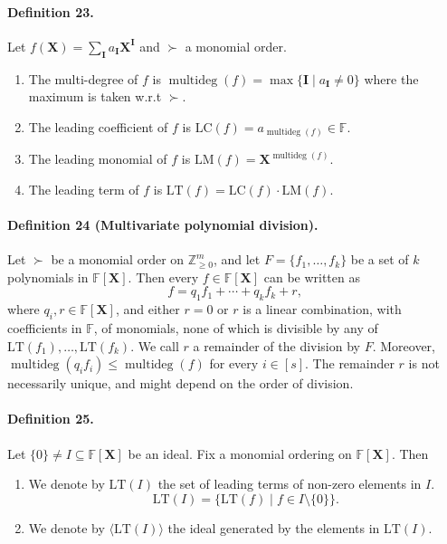 \documentclass[10pt,a4paper]{article}
\begin{document}
\paragraph{Definition 23.} Let $f(\boldsymbol X)=\sum_{\boldsymbol I}a_{\boldsymbol I}\boldsymbol X^{\boldsymbol I}$ and $\succ$ a monomial order.
\begin{enumerate}
\item The multi-degree of $f$ is $\operatorname{multideg}(f)=\max\{\boldsymbol I\mid a_{\boldsymbol I}\neq0\}$ where the maximum is taken w.r.t $\succ$.
\item The leading coefficient of $f$ is $\mathrm{LC}(f)=a_{\operatorname{multideg}(f)}\in\mathbb F$.
\item The leading monomial of $f$ is $\mathrm{LM}(f)=\boldsymbol X^{\operatorname{multideg}(f)}$.
\item The leading term of $f$ is $\mathrm{LT}(f)=\mathrm{LC}(f)\cdot\mathrm{LM}(f)$.
\end{enumerate}
\paragraph{Definition 24 (Multivariate polynomial division).} Let $\succ$ be a monomial order on $\mathbb Z_{\geq0}^m$, and let $F=\{f_1,\ldots,f_k\}$ be a set of $k$ polynomials in $\mathbb F[\boldsymbol X]$. Then every $f\in\mathbb F[\boldsymbol X]$ can be written as
\[f=q_1f_1+\cdots+q_kf_k+r,\]
where $q_i,r\in\mathbb F[\boldsymbol X]$, and either $r=0$ or $r$ is a linear combination, with coefficients in $\mathbb F$, of monomials, none of which is divisible by any of $\mathrm{LT}(f_1),\ldots,\mathrm{LT}(f_k)$. We call $r$ a remainder of the division by $F$. Moreover, $\operatorname{multideg}(q_if_i)\leq\operatorname{multideg}(f)$ for every $i\in[s]$. The remainder $r$ is not necessarily unique, and might depend on the order of division.
\paragraph{Definition 25.} Let $\{0\}\neq I\subseteq\mathbb F[\boldsymbol X]$ be an ideal. Fix a monomial ordering on $\mathbb F[\boldsymbol X]$. Then
\begin{enumerate}
\item We denote by $\mathrm{LT}(I)$ the set of leading terms of non-zero elements in $I$.
\[\mathrm{LT}(I)=\{\mathrm{LT}(f)\mid f\in I\setminus\{0\}\}.\]
\item We denote by $\langle\mathrm{LT}(I)\rangle$ the ideal generated by the elements in $\mathrm{LT}(I)$.
\end{enumerate}
\end{document}
